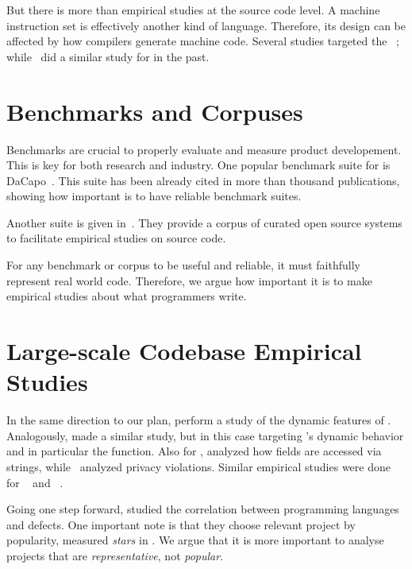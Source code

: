 \documentclass{usiinfdocprop}
\begin{document}
But there is more than empirical studies at the source code level.
A machine instruction set is effectively another kind of language.
Therefore, its design can be affected by how compilers generate machine code.
Several studies targeted the \jvm{}~\cite{collberg_empirical_2007,odonoghue_bigram_2002,antonioli_analysis_1998}; while~\cite{cook_empirical_1989} did a similar study for \lilith{} in the past.

\section{Benchmarks and Corpuses \label{org915ed7f}}
\label{sec:org70f55a6}

Benchmarks are crucial to properly evaluate and measure product developement.
This is key for both research and industry.
One popular benchmark suite for \java{} is DaCapo~\cite{blackburn_dacapo_2006}.
This suite has been already cited in more than thousand publications, showing how important is to have reliable benchmark suites.

Another suite is given in~\cite{tempero_qualitas_2010}.
They provide a corpus of curated open source systems to facilitate empirical studies on source code.

For any benchmark or corpus to be useful and reliable, it must faithfully represent real world code.
Therefore, we argue how important it is to make empirical studies about what programmers write.

\section{Large-scale Codebase Empirical Studies \label{org17a821c}}
\label{sec:org3e712ff}

In the same direction to our plan, \cite{callau_how_2013} perform a study of the dynamic features of \smalltalk{}.
Analogously, \cite{richards_analysis_2010,richards_eval_2011} made a similar study, but in this case targeting \javascript{}'s dynamic behavior and in particular the \eval{} function.
Also for \javascript{}, \cite{madsen_string_2014} analyzed how fields are accessed via strings, while~\cite{jang_empirical_2010} analyzed privacy violations.
Similar empirical studies were done for \php{}~\cite{hills_empirical_2013,dahse_experience_2015,doyle_empirical_2011} and \swift{}~\cite{reboucas_empirical_2016}. 

Going one step forward, \cite{ray_large-scale_2017} studied the correlation between programming languages and defects.
One important note is that they choose relevant project by popularity, measured \emph{stars} in \github{}.
We argue that it is more important to analyse projects that are \emph{representative}, not \emph{popular}.
\end{document}
